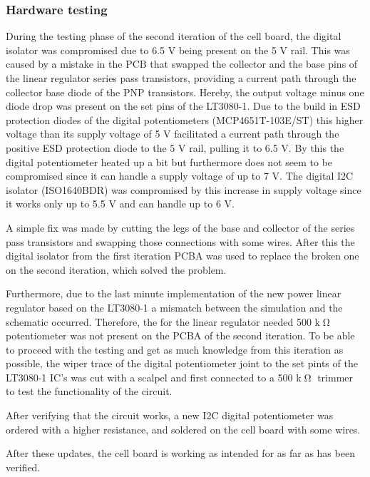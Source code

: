 \subsubsection{Hardware testing}
During the testing phase of the second iteration of the cell board, the digital isolator was compromised due to 6.5 V being present on the 5 V rail. This was caused by a mistake in the PCB that swapped the collector and the base pins of the linear regulator series pass transistors, providing a current path through the collector base diode of the PNP transistors. Hereby, the output voltage minus one diode drop was present on the set pins of the LT3080-1. Due to the build in ESD protection diodes of the digital potentiometers (MCP4651T-103E/ST) this higher voltage than its supply voltage of 5 V facilitated a current path through the positive ESD protection diode to the 5 V rail, pulling it to 6.5 V. By this the digital potentiometer heated up a bit but furthermore does not seem to be compromised since it can handle a supply voltage of up to 7 V. The digital I2C isolator (ISO1640BDR) was compromised by this increase in supply voltage since it works only up to 5.5 V and can handle up to 6 V. 

A simple fix was made by cutting the legs of the base and collector of the series pass transistors and swapping those connections with some wires. After this the digital isolator from the first iteration PCBA was used to replace the broken one on the second iteration, which solved the problem.

Furthermore, due to the last minute implementation of the new power linear regulator based on the LT3080-1 a mismatch between the simulation and the schematic occurred. Therefore, the for the linear regulator needed 500 k$\tcohm$ potentiometer was not present on the PCBA of the second iteration. To be able to proceed with the testing and get as much knowledge from this iteration as possible, the wiper trace of the digital potentiometer joint to the set pints of the LT3080-1 IC's was cut with a scalpel and first connected to a 500 k$\tcohm$ trimmer to test the functionality of the circuit.

After verifying that the circuit works, a new I2C digital potentiometer was ordered with a higher resistance, and soldered on the cell board with some wires.

After these updates, the cell board is working as intended for as far as has been verified.